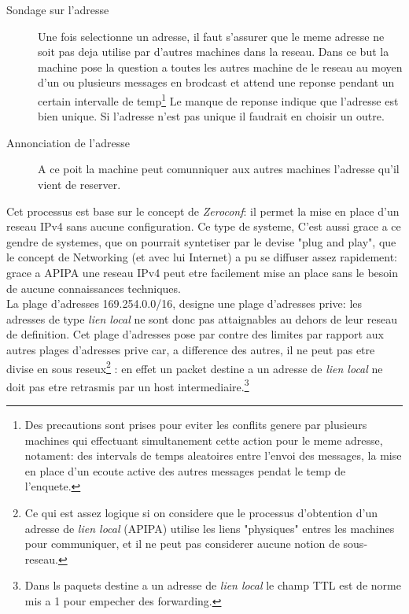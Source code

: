 \begin{description}
\begin{description}
\item[Sondage sur l'adresse]
Une fois selectionne un adresse, il faut s'assurer que le meme adresse ne soit
pas deja utilise par d'autres machines dans la reseau. Dans ce but la machine
pose la question a toutes les autres machine de le reseau au moyen d'un ou plusieurs messages
en brodcast et attend une reponse pendant un certain intervalle de temp\footnote{
Des precautions sont prises pour eviter les conflits genere par plusieurs
machines qui effectuant simultanement cette action pour le meme adresse,
notament: des intervals de temps aleatoires entre l'envoi des messages, la mise
en place d'un ecoute active des autres messages pendat le temp de l'enquete.}
Le manque de reponse indique que l'adresse est bien unique. Si l'adresse n'est
pas unique il faudrait en choisir un outre.

\item[Annonciation de l'adresse]
A ce poit la machine peut comunniquer aux autres machines l'adresse qu'il
vient de reserver.

\end{description}



Cet processus est base sur le concept de {\it Zeroconf}: il permet la mise en
place d'un reseau IPv4 sans aucune configuration. Ce type de systeme,
C'est aussi grace a ce gendre de systemes, que on 
pourrait syntetiser par le devise %
"plug and play", que le concept de Networking (et avec lui Internet) a pu se
diffuser assez rapidement: grace a APIPA une reseau IPv4 peut etre facilement
mise an place sans le besoin de aucune connaissances techniques.\\

La plage d'adresses 169.254.0.0/16, designe une plage d'adresses prive: les
adresses de type {\it lien local} ne sont donc pas attaignables au dehors de
leur reseau de definition. 
Cet plage d'adresses pose  par contre des limites par rapport aux autres
plages d'adresses prive car, a difference des autres, il ne peut pas etre
divise en sous reseux\footnote{Ce qui est assez logique si on considere que
le processus d'obtention d'un adresse de {\it lien local} (APIPA) utilise
les liens "physiques" entres les machines pour communiquer, et il ne peut
pas considerer aucune notion de sous-reseau.}
: en effet un packet destine a un adresse de {\it lien local} ne doit pas etre
retrasmis par un host intermediaire.\footnote{Dans ls paquets destine
a un adresse de {\it lien local} le champ TTL est de norme mis a 1
pour empecher des forwarding.}


\end{description}
